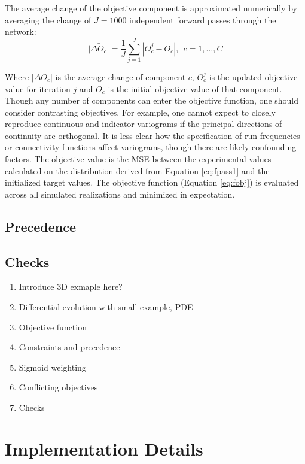 The average change of the objective component is approximated numerically by averaging the change of $J=1000$ independent forward passes through the network:
\begin{equation}
    \bar{|\Delta O_{c}|} = \frac{1}{J} \sum_{j=1}^{J} | O^{j}_{c} - O_{c}|, \ \ c=1,\dots, C
    \label{eq:fobj_avg}
\end{equation}

Where $\bar{|\Delta O_{c}|}$ is the average change of component $c$, $O^{j}_{c}$ is the updated objective value for iteration $j$ and $O_{c}$ is the initial objective value of that component. Though any number of components can enter the objective function, one should consider contrasting objectives. For example, one cannot expect to closely reproduce continuous and indicator variograms if the principal directions of continuity are orthogonal. It is less clear how the specification of run frequencies or connectivity functions affect variograms, though there are likely confounding factors. The objective value is the \gls{MSE} between the experimental values calculated on the distribution derived from Equation \ref{eq:fpass1} and the initialized target values. The objective function (Equation \ref{eq:fobj}) is evaluated across all simulated realizations and minimized in expectation.

\subsection{Precedence}
\label{subsec:04precedence}

\subsection{Checks}
\label{subsec:04checks}

\begin{enumerate}[noitemsep]
    \item Introduce 3D exmaple here?
    \item Differential evolution with small example, PDE
    \item Objective function
    \item Constraints and precedence
    \item Sigmoid weighting
    \item Conflicting objectives
    \item Checks
\end{enumerate}


\FloatBarrier
\section{Implementation Details}
\label{sec:04implementd}

